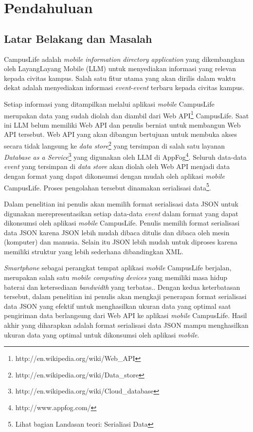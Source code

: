 \documentclass[a4paper, 12pt, oneside]{report}
\begin{document}
\chapter{Pendahuluan}
\section{Latar Belakang dan Masalah}
\onehalfspacing CampusLife adalah \textit{mobile information directory application} yang dikembangkan oleh LayangLayang Mobile (LLM) untuk menyediakan informasi yang relevan kepada civitas kampus. Salah satu fitur utama yang akan dirilis dalam waktu dekat adalah menyediakan informasi \textit{event}-\textit{event} terbaru kepada civitas kampus. 

\onehalfspacing Setiap informasi yang ditampilkan melalui aplikasi \textit{mobile} CampusLife merupakan data yang sudah diolah dan diambil dari Web API\footnote{http://en.wikipedia.org/wiki/Web\_API} CampusLife. Saat ini LLM belum memiliki Web API dan penulis berniat untuk membangun Web API tersebut. Web API yang akan dibangun bertujuan untuk membuka akses secara tidak langsung ke \textit{data store}\footnote{http://en.wikipedia.org/wiki/Data\_store} yang tersimpan di salah satu layanan \textit{Database as a Service}\footnote{http://en.wikipedia.org/wiki/Cloud\_database} yang digunakan oleh LLM di AppFog\footnote{http://www.appfog.com/}. Seluruh data-data \textit{event} yang tersimpan di \textit{data store} akan diolah oleh Web API menjadi data dengan format yang dapat dikonsumsi dengan mudah oleh aplikasi \textit{mobile} CampusLife. Proses pengolahan tersebut dinamakan serialisasi data\footnote{Lihat bagian Landasan teori: Serialiasi Data}.

\onehalfspacing Dalam penelitian ini penulis akan memilih format serialisasi data JSON untuk digunakan merepresentasikan setiap data-data \textit{event} dalam format yang dapat dikonsumsi oleh aplikasi \textit{mobile} CampusLife. Penulis memilih format serialisasi data JSON karena JSON lebih mudah dibaca ditulis dan dibaca oleh mesin (komputer) dan manusia. Selain itu JSON lebih mudah untuk diproses karena memiliki struktur yang lebih sederhana dibandingkan XML\cite{json-fat-free}\cite{json-vs-xml-debate}.

\onehalfspacing \textit{Smartphone} sebagai perangkat tempat aplikasi \textit{mobile} CampusLife berjalan, merupakan salah satu \textit{mobile computing devices} yang memiliki masa hidup baterai dan ketersediaan \textit{bandwidth} yang terbatas.\cite{challenging-issues-and-limitations-of-mobile-computing}. Dengan kedua keterbatasan tersebut, dalam penelitian ini penulis akan mengkaji penerapan format serialisasi data JSON yang efektif untuk menghasilkan ukuran data yang optimal saat pengiriman data berlangsung dari Web API ke aplikasi \textit{mobile} CampusLife. Hasil akhir yang diharapkan adalah format serialisasi data JSON mampu menghasilkan ukuran data yang optimal untuk dikonsumsi oleh aplikasi \textit{mobile}.
\end{document}
